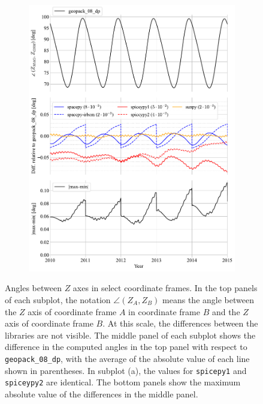 \documentclass[draft]{agujournal2019}
\begin{document}
\begin{figure}[htb]
\begin{subfigure}[b]{0.49\textwidth}
         \includegraphics[width=\textwidth]{code/figures/angles/delta=1days_20100101-20150101/MAG_GSM.pdf}
     \end{subfigure}
     \caption{Angles between $Z$ axes in select coordinate frames. In the top panels of each subplot, the notation $\angle (Z_A, Z_B)$ means the angle between the $Z$ axis of coordinate frame $A$ in coordinate frame $B$ and the $Z$ axis of coordinate frame $B$. At this scale, the differences between the libraries are not visible. The middle panel of each subplot shows the difference in the computed angles in the top panel with respect to \texttt{geopack\_08\_dp}, with the average of the absolute value of each line shown in parentheses. In subplot (a), the values for \texttt{spicepy1} and \texttt{spiceypy2} are identical. The bottom panels show the maximum absolute value of the differences in the middle panel.}
     \label{fig:angles}
\end{figure}

\clearpage
\end{document}
